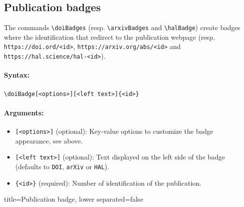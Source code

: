 \subsection{Publication badges}

The commands \texttt{\textbackslash doiBadges} (resp. \texttt{\textbackslash arxivBadges} and \texttt{\textbackslash halBadge}) create badges where the identification that redirect to the publication webpage (resp. \texttt{https://doi.ord/<id>}, \texttt{https://arxiv.org/abs/<id>} and \texttt{https://hal.science/hal-<id>}).

\paragraph{Syntax:}
\begin{verbatim}
\doiBadge[<options>][<left text>]{<id>}
\end{verbatim}

\paragraph{Arguments:}
\begin{itemize}
    \item \texttt{[<options>]} (optional): Key-value options to customize the badge appearance, see above.
    \item \texttt{[<left text>]} (optional): Text displayed on the left side of the badge (defaults to \texttt{DOI}, \texttt{arXiv} or \texttt{HAL}).
    \item \texttt{\{<id>\}} (required): Number of identification of the publication.
\end{itemize}


\begin{tcblisting}{title={Publication badge}, lower separated=false}
\end{tcblisting}
